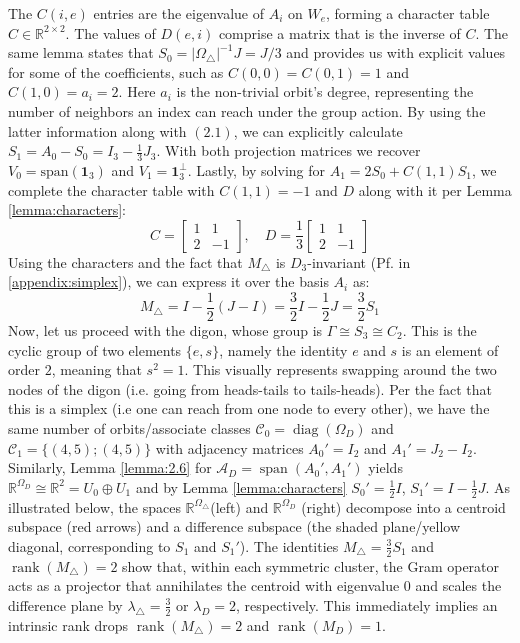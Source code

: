 \documentclass{article}
\theoremstyle{plain}
\numberwithin{equation}{section}
\theoremstyle{definition}
\theoremstyle{remark}
\begin{document}
The $C(i, e)$ entries are the eigenvalue of $A_i$ on $W_e$, forming a character table $C\in \mathbb{R}^{2\times 2}$. The values of $D(e, i)$ comprise a matrix that is the inverse of $C$. The same lemma states that $S_0 = |\Omega_\triangle|^{-1}J = J/3$ and provides us with explicit values for some of the coefficients, such as $C(0, 0) = C(0, 1) = 1$ and $C(1, 0) = a_i= 2$. Here $a_i$ is the non-trivial orbit's degree, representing the number of neighbors an index can reach under the group action. By using the latter information along with $(2.1)$, we can explicitly calculate $S_1 = A_0 - S_0 = I_3-\frac{1}{3}J_3$. With both projection matrices we recover $V_0 = \text{span}(\mathbf{1}_3)$ and $V_1 = \mathbf{1}_3^\perp$. Lastly, by solving for $A_1 = 2S_0 + C(1,1)S_1$, we complete the character table with $C(1, 1) = -1$ and $D$ along with it per Lemma \ref{lemma:characters}: $$C = \begin{bmatrix}1 & 1 \\ 2 & -1\end{bmatrix}, \quad D = \frac{1}{3}\begin{bmatrix}
1 & 1 \\ 2 & -1
\end{bmatrix}$$
Using the characters and the fact that $M_\triangle$ is $D_3$-invariant (Pf. in \ref{appendix:simplex}), we can express it over the basis $A_i$ as:
$$M_\triangle  =  I - \frac{1}{2} (J-I) =\frac{3}{2}I - \frac{1}{2}J = \frac{3}{2}S_1$$
Now, let us proceed with the digon, whose group is $\Gamma \cong S_3 \cong C_2$. This is the cyclic group of two elements $\{e, s\}$, namely the identity $e$ and $s$ is an element of order $2$, meaning that $s^2=1$. This visually represents swapping around the two nodes of the digon (i.e. going from heads-tails to tails-heads). Per the fact that this is a simplex (i.e one can reach from one node to every other), we have the same number of orbits/associate classes $\mathcal{C}_0 =\operatorname{diag}(\Omega_D)$ and $\mathcal{C}_1 = \{(4, 5); (4, 5)\}$ with adjacency matrices $A_0' = I_2$ and  $A_1'=J_2-I_2$. Similarly, Lemma \ref{lemma:2.6} for $\mathcal{A}_D = \operatorname{span}(A_0', A_1')$ yields $\mathbb{R}^{\Omega_D} \cong \mathbb{R}^2 = U_0\oplus U_1$ and by Lemma \ref{lemma:characters} $S_0' = \frac{1}{2}I$, $S_1' = I-\frac{1}{2}J$. As illustrated below, the spaces $\mathbb{R}^{\Omega_\triangle}$(left) and $\mathbb{R}^{\Omega_D}$ (right) decompose into a centroid subspace (red arrows) and a difference subspace (the shaded plane/yellow diagonal, corresponding to $S_1$ and $S_1'$). The identities $M_\triangle = \frac{3}{2}S_1$ and $\operatorname{rank}(M_\triangle)=2$ show that, within each symmetric cluster, the Gram operator acts as a projector that annihilates the centroid with eigenvalue $0$ and scales the difference plane by $\lambda_\triangle = \frac{3}{2}$ or $\lambda_D = 2$, respectively. This immediately implies an intrinsic rank drops $\operatorname{rank}(M_\triangle)=2$ and $\operatorname{rank}(M_D)=1$. 
 
\end{document}
